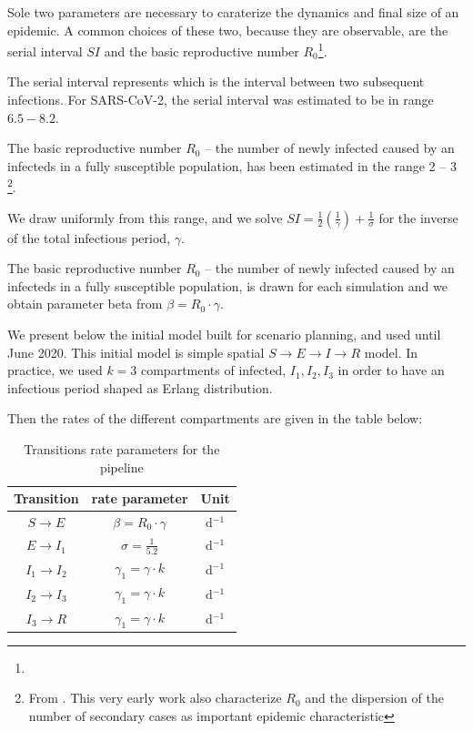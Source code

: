 Sole two parameters are necessary to caraterize the dynamics and final size of an epidemic. A common choices of these two, because they are observable, are the serial interval $SI$ and the basic reproductive number $R_0$\footnote{}.

The serial interval represents which is the interval between two subsequent infections. For SARS-CoV-2, the serial interval was estimated to be in range $6.5-8.2$\cite[][Table S4]{Bi:EpidemiologyTransmissionCOVID19:2020}. 

The basic reproductive number $R_0$ -- the number of newly infected caused by an infecteds in a fully susceptible population, has been estimated in the range 2 -- 3 \footnote{From . This very early work also characterize $R_0$ and the dispersion of the number of secondary cases as important epidemic characteristic}.



We draw uniformly from this range, and we solve
$SI = \frac{1}{2}(\frac{1}{\gamma})+\frac{1}{\sigma}$ for the inverse of the total infectious period, $\gamma$.

The basic reproductive number $R_0$ -- the number of newly infected caused by an infecteds in a fully susceptible population, is drawn for each simulation and we obtain parameter beta from
$\beta= R_0 \cdot \gamma$.

We present below the initial model built for scenario planning, and used until June 2020. This initial model is simple spatial $S\longrightarrow E \longrightarrow I \longrightarrow R$ model. In practice, we used $k = 3$ compartments of infected, $I_1, I_2, I_3$ in order to have an infectious period shaped as Erlang distribution.



Then the rates of the different compartments are given in the table below:
\begin{table}
    \centering
    \begin{tabular}{ccc}
\toprule
Transition & rate parameter &Unit \\
 \midrule
$S\longrightarrow E$  &   $\beta = R_0 \cdot \gamma$  & d$^{-1}$\\
$E\longrightarrow I_1$ & $\sigma = \frac{1}{5.2}$         & d$^{-1}$\\
$I_1\longrightarrow I_2$ & $\gamma_1 = \gamma \cdot k$ & d$^{-1}$\\
$I_2\longrightarrow I_3$ & $\gamma_1 = \gamma \cdot k$ & d$^{-1}$\\
$I_3\longrightarrow R$ & $\gamma_1 = \gamma \cdot k$&d$^{-1}$\\
\bottomrule
\end{tabular}
\caption{Transitions rate parameters for the pipeline}
     \label{tab:survpars}
\end{table}


